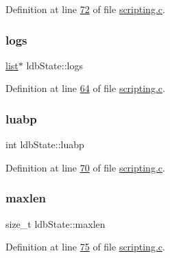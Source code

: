 Definition at line \hyperlink{scripting_8c_source_l00072}{72} of file \hyperlink{scripting_8c_source}{scripting.\+c}.

\mbox{\label{structldbState_ad3f673e02a95895965ed27bb0a9df1da}} 
\subsubsection{\texorpdfstring{logs}{logs}}
{\footnotesize\ttfamily \hyperlink{structlist}{list}$\ast$ ldb\+State\+::logs}



Definition at line \hyperlink{scripting_8c_source_l00064}{64} of file \hyperlink{scripting_8c_source}{scripting.\+c}.

\mbox{\label{structldbState_a068c057bfe488a40051a32ae8cddd5e3}} 
\subsubsection{\texorpdfstring{luabp}{luabp}}
{\footnotesize\ttfamily int ldb\+State\+::luabp}



Definition at line \hyperlink{scripting_8c_source_l00070}{70} of file \hyperlink{scripting_8c_source}{scripting.\+c}.

\mbox{\label{structldbState_a85263abf445773db98e67df683f1326c}} 
\subsubsection{\texorpdfstring{maxlen}{maxlen}}
{\footnotesize\ttfamily size\+\_\+t ldb\+State\+::maxlen}



Definition at line \hyperlink{scripting_8c_source_l00075}{75} of file \hyperlink{scripting_8c_source}{scripting.\+c}.

\mbox{\label{structldbState_a02b0bf815df044cbea603c081bc9fef5}} 
